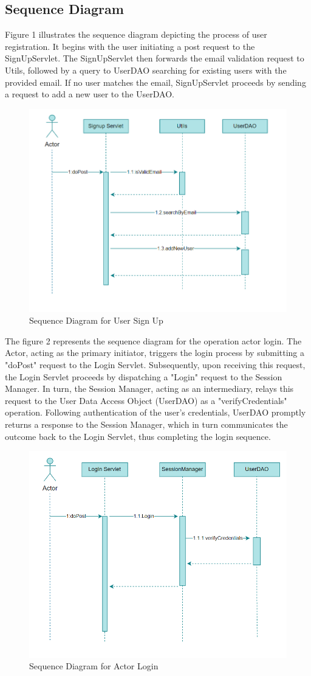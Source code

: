 \subsection{Sequence Diagram}

Figure 1 illustrates the sequence diagram depicting the process of user registration. It begins with the user initiating a post request to the SignUpServlet. The SignUpServlet then forwards the email validation request to Utils, followed by a query to UserDAO searching for existing users with the provided email. If no user matches the email, SignUpServlet proceeds by sending a request to add a new user to the UserDAO. 

\begin{figure}[h]
    \centering
    \includegraphics[width=0.75\linewidth]{sections/BLL/SignUpSqDiag.png}
    \caption{Sequence Diagram for User Sign Up}
    \label{fig:sequence-diagram-signup}
\end{figure}

The figure 2 represents the sequence diagram for the operation actor login. The Actor, acting as the primary initiator, triggers the login process by submitting a "doPost" request to the Login Servlet. Subsequently, upon receiving this request, the Login Servlet proceeds by dispatching a "Login" request to the Session Manager. In turn, the Session Manager, acting as an intermediary, relays this request to the User Data Access Object (UserDAO) as a "verifyCredentials" operation. Following authentication of the user's credentials, UserDAO promptly returns a response to the Session Manager, which in turn communicates the outcome back to the Login Servlet, thus completing the login sequence.

\begin{figure}[h]
    \centering
    \includegraphics[width=0.75\linewidth]{sections/BLL/LoginSqDiag.png}
    \caption{Sequence Diagram for Actor Login}
    \label{fig:sequence-diagram-login}
\end{figure}



